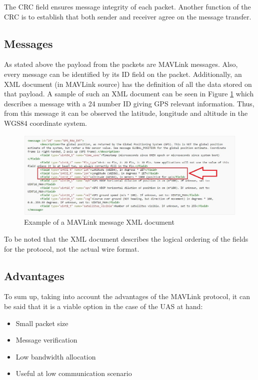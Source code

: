 The CRC field ensures message integrity of each packet. Another function of the CRC is to establish that both sender and receiver agree on the message transfer.

\subsection*{Messages}
As stated above the payload from the packets are MAVLink messages. Also, every message can be identified by its ID field on the packet. Additionally, an XML document (in MAVLink source) has the definition of all the data stored on that payload. A sample of such an XML document can be seen in Figure \ref{fig:mav_msg} which describes a message with a 24 number ID giving GPS relevant information. Thus, from this message it can be observed the latitude, longitude and altitude in the WGS84 coordinate system.

\begin{figure}[H]
	\centering
	\includegraphics[scale=0.5]{figures/mavlink_msg.jpg}
	\caption{Example of a MAVLink message XML document}
	\label{fig:mav_msg}
\end{figure}

To be noted that the XML document describes the logical ordering of the fields for the protocol, not the actual wire format.

\subsection*{Advantages}
To sum up, taking into account the advantages of the MAVLink protocol, it can be said that it is a viable option in the case of the UAS at hand:
\begin{itemize}
	\item Small packet size
	\item Message verification
	\item Low bandwidth allocation
	\item Useful at low communication scenario
\end{itemize}
